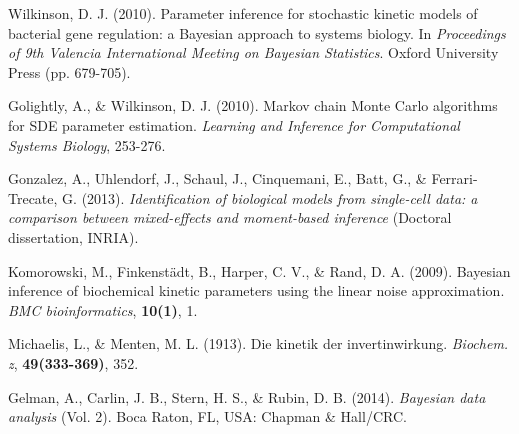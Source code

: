 \documentclass{bioinfo}
\begin{document}
\begin{thebibliography}{}
Wilkinson, D. J. (2010). Parameter inference for stochastic kinetic models of bacterial gene regulation: a Bayesian approach to systems biology. In \textit{Proceedings of 9th Valencia International Meeting on Bayesian Statistics}. Oxford University Press (pp. 679-705).

Golightly, A., \& Wilkinson, D. J. (2010). Markov chain Monte Carlo algorithms for SDE parameter estimation. \textit{Learning and Inference for Computational Systems Biology}, 253-276.

Gonzalez, A., Uhlendorf, J., Schaul, J., Cinquemani, E., Batt, G., \& Ferrari-Trecate, G. (2013). \textit{Identification of biological models from single-cell data: a comparison between mixed-effects and moment-based inference} (Doctoral dissertation, INRIA).

Komorowski, M., Finkenst\"adt, B., Harper, C. V., \& Rand, D. A. (2009). Bayesian inference of biochemical kinetic parameters using the linear noise approximation. \textit{BMC bioinformatics}, \textbf{10(1)}, 1.

Michaelis, L., \& Menten, M. L. (1913). Die kinetik der invertinwirkung. \textit{Biochem. z}, \textbf{49(333-369)}, 352.

Gelman, A., Carlin, J. B., Stern, H. S., \& Rubin, D. B. (2014). \textit{Bayesian data analysis} (Vol. 2). Boca Raton, FL, USA: Chapman \& Hall/CRC.

\end{thebibliography}
\end{document}

